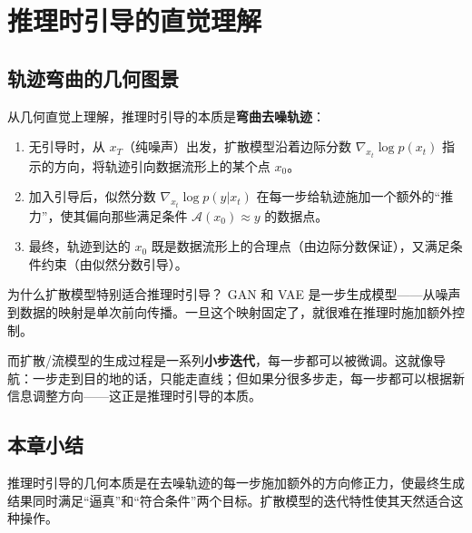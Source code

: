 \section{推理时引导的直觉理解}

\subsection{轨迹弯曲的几何图景}

从几何直觉上理解，推理时引导的本质是\textbf{弯曲去噪轨迹}：

\begin{enumerate}
    \item 无引导时，从 $x_T$（纯噪声）出发，扩散模型沿着边际分数 $\nabla_{x_t} \log p(x_t)$ 指示的方向，将轨迹引向数据流形上的某个点 $x_0$。
    \item 加入引导后，似然分数 $\nabla_{x_t} \log p(y|x_t)$ 在每一步给轨迹施加一个额外的``推力''，使其偏向那些满足条件 $\mathcal{A}(x_0) \approx y$ 的数据点。
    \item 最终，轨迹到达的 $x_0$ 既是数据流形上的合理点（由边际分数保证），又满足条件约束（由似然分数引导）。
\end{enumerate}

\begin{knowledgebox}{为什么扩散模型特别适合推理时引导？}
GAN 和 VAE 是一步生成模型——从噪声到数据的映射是单次前向传播。一旦这个映射固定了，就很难在推理时施加额外控制。

而扩散/流模型的生成过程是一系列\textbf{小步迭代}，每一步都可以被微调。这就像导航：一步走到目的地的话，只能走直线；但如果分很多步走，每一步都可以根据新信息调整方向——这正是推理时引导的本质。
\end{knowledgebox}

\subsection{本章小结}

推理时引导的几何本质是在去噪轨迹的每一步施加额外的方向修正力，使最终生成结果同时满足``逼真''和``符合条件''两个目标。扩散模型的迭代特性使其天然适合这种操作。


